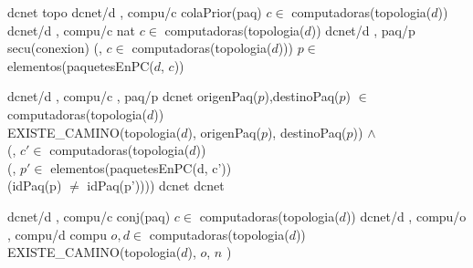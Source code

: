 \begin{tad}{}


\tadObservadores
	 {dcnet} {topo} {}
	 {dcnet/d , compu/c} {colaPrior(paq)} {$c\in$ computadoras(topologia($d$))}
	 {dcnet/d , compu/c} {nat} {$c\in$ computadoras(topologia($d$))} 
	 {dcnet/d , paq/p} {secu(conexion)} {(, $c \in$ computadoras(topologia($d$))) $p\in$ elementos(paquetesEnPC($d$, $c$))}

\tadGeneradores
 	 {dcnet/d , compu/c , paq/p} {dcnet} {origenPaq($p$),destinoPaq($p$) $\in$ computadoras(topologia($d$)) \yluego\\
  EXISTE\_CAMINO(topologia($d$), origenPaq($p$), destinoPaq($p$)) $\land$ \\
  (, $c' \in$ computadoras(topologia($d$))\\
  \hspace*{3em}(, $p' \in$ elementos(paquetesEnPC(d, c'))\\
  \hspace*{6em}(idPaq(p) $\neq$ idPaq(p'))))}
	 {dcnet} {dcnet} {}

\tadOtrasOperaciones
{}
	 {dcnet/d , compu/c} {conj(paq)} {$c\in$ computadoras(topologia($d$))}
	 {dcnet/d , compu/o , compu/d} {compu} {$o,d \in$ computadoras(topologia($d$)) \yluego EXISTE\_CAMINO(topologia($d$), $o$, $n$ )}
		


\end{tad}
